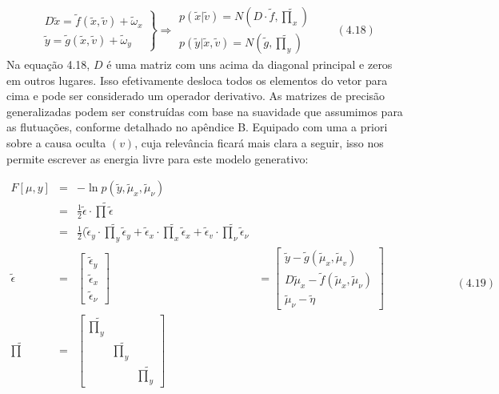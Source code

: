 \documentclass[
  12pt,
]{book}
\begin{document}
\[\left . \begin{matrix} D\tilde x = \tilde f(\tilde x,\tilde v) + \tilde \omega_x \\ \tilde y = \tilde g(\tilde x,\tilde v) + \tilde \omega_y \end{matrix} \right \} \Longrightarrow \begin{matrix} p(\tilde x |\tilde v) = N(D \cdot \tilde f, \tilde \prod_x) \\ p(\tilde y |\tilde x,\tilde v) = N( \tilde g, \tilde \prod_y) \end{matrix} \qquad (4.18) \]
Na equação 4.18, \(D\) é uma matriz com uns acima da diagonal principal e
zeros em outros lugares. Isso efetivamente desloca todos os elementos do
vetor para cima e pode ser considerado um operador derivativo. As
matrizes de precisão generalizadas podem ser construídas com base na
suavidade que assumimos para as flutuações, conforme detalhado no
apêndice B. Equipado com uma a priori sobre a causa oculta \((v)\), cuja
relevância ficará mais clara a seguir, isso nos permite escrever as
energia livre para este modelo generativo:

\[ \begin{matrix} 
F[\mu,y] & = & -\ln p(\tilde y, \tilde \mu_x , \tilde \mu_\nu) \\ 
  & = & \frac{1}{2}\tilde \epsilon \cdot \tilde \prod \tilde \epsilon \\
  & = & \frac{1}{2}(\tilde \epsilon_y \cdot \tilde \prod_y \tilde \epsilon_y + \tilde \epsilon_x \cdot \tilde \prod_x \tilde \epsilon_x + \tilde \epsilon_v \cdot \tilde \prod_\nu \tilde \epsilon_\nu  \\
\tilde \epsilon & = & \begin{bmatrix} \tilde \epsilon_y \\ \tilde \epsilon_x \\ \tilde \epsilon_\nu \end{bmatrix} & = \begin{bmatrix} \tilde y - \tilde g(\tilde \mu_x,\tilde \mu_v)\\ D\tilde \mu_x - \tilde f(\tilde \mu_x,\tilde \mu_\nu) \\ \tilde \mu_\nu - \tilde \eta \end{bmatrix} \\
\tilde \prod & = & \begin{bmatrix} \tilde \prod_y & & \\   & \tilde \prod_y & \\  &   & \tilde \prod_y \end{bmatrix} 
\end{matrix}  \qquad \qquad \qquad (4.19)\]
\end{document}
